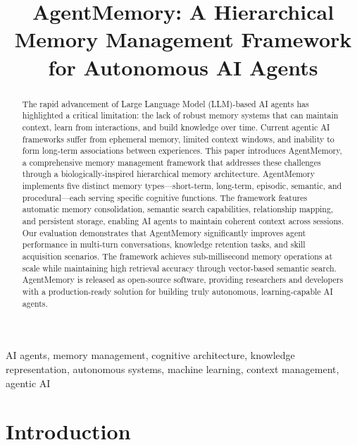 \documentclass[journal]{IEEEtran}
\begin{document}
\title{AgentMemory: A Hierarchical Memory Management Framework for Autonomous AI Agents}

\author{
}

\maketitle

\begin{abstract}
The rapid advancement of Large Language Model (LLM)-based AI agents has highlighted a critical limitation: the lack of robust memory systems that can maintain context, learn from interactions, and build knowledge over time. Current agentic AI frameworks suffer from ephemeral memory, limited context windows, and inability to form long-term associations between experiences. This paper introduces AgentMemory, a comprehensive memory management framework that addresses these challenges through a biologically-inspired hierarchical memory architecture. AgentMemory implements five distinct memory types—short-term, long-term, episodic, semantic, and procedural—each serving specific cognitive functions. The framework features automatic memory consolidation, semantic search capabilities, relationship mapping, and persistent storage, enabling AI agents to maintain coherent context across sessions. Our evaluation demonstrates that AgentMemory significantly improves agent performance in multi-turn conversations, knowledge retention tasks, and skill acquisition scenarios. The framework achieves sub-millisecond memory operations at scale while maintaining high retrieval accuracy through vector-based semantic search. AgentMemory is released as open-source software, providing researchers and developers with a production-ready solution for building truly autonomous, learning-capable AI agents.
\end{abstract}

\begin{IEEEkeywords}
AI agents, memory management, cognitive architecture, knowledge representation, autonomous systems, machine learning, context management, agentic AI
\end{IEEEkeywords}

\section{Introduction}
\end{document}
